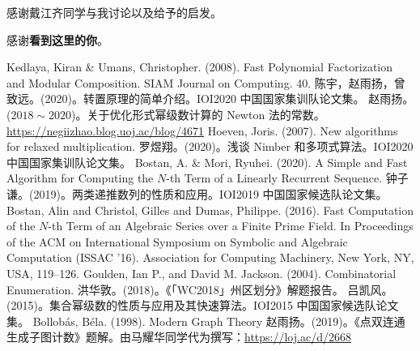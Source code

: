 感谢戴江齐同学与我讨论以及给予的启发。

\ifcont
感谢\textbf{看{\color{red}到这里的你}}。
\fi

\begin{thebibliography}{99}
\ifcont
{}
\fi
{} Kedlaya, Kiran \& Umans, Christopher. (2008). Fast Polynomial Factorization and Modular Composition. SIAM Journal on Computing. 40. 
 陈宇，赵雨扬，曾致远。(2020)。转置原理的简单介绍。IOI2020 中国国家集训队论文集。
 赵雨扬。($2018\sim 2020$)。关于优化形式幂级数计算的 Newton 法的常数。\url{https://negiizhao.blog.uoj.ac/blog/4671}
 Hoeven, Joris. (2007). New algorithms for relaxed multiplication.  
 罗煜翔。(2020)。浅谈 Nimber 和多项式算法。IOI2020 中国国家集训队论文集。
 Bostan, A. \& Mori, Ryuhei. (2020). A Simple and Fast Algorithm for Computing the $N$-th Term of a Linearly Recurrent Sequence. 
 钟子谦。(2019)。两类递推数列的性质和应用。IOI2019 中国国家候选队论文集。
 Bostan, Alin and Christol, Gilles and Dumas, Philippe. (2016). Fast Computation of the $N$-th Term of an Algebraic Series over a Finite Prime Field. In Proceedings of the ACM on International Symposium on Symbolic and Algebraic Computation (ISSAC '16). Association for Computing Machinery, New York, NY, USA, 119–126. 
 Goulden, Ian P., and David M. Jackson. (2004). Combinatorial Enumeration.
 洪华敦。(2018)。《「WC2018」州区划分》解题报告。
 吕凯风。(2015)。集合幂级数的性质与应用及其快速算法。IOI2015 中国国家候选队论文集。
 Bollob\'as, B\'ela. (1998). Modern Graph Theory
 赵雨扬。(2019)。《点双连通生成子图计数》题解。由马耀华同学代为撰写：\url{https://loj.ac/d/2668}
\end{thebibliography}
